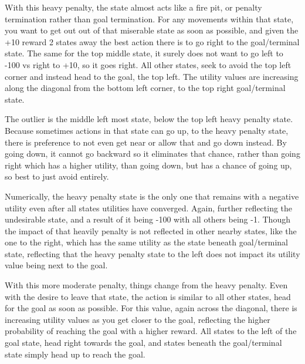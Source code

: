 \documentclass[12pt]{article}
\begin{document}
\begin{description}[leftmargin=0cm]
	\item[When R = -100] \hfill \break
		With this heavy penalty, the state almost acts like a fire pit, or penalty termination
		rather than goal termination. For any movements within that state, you want to get out
		out of that miserable state as soon as possible, and given the +10 reward 2 states away
		the best action there is to go right to the goal/terminal state. The same for the top
		middle state, it surely does not want to go left to -100 vs right to +10, so it goes
		right. All other states, seek to avoid the top left corner and instead head
		to the goal, the top left. The utility values are increasing along the diagonal from
		the bottom left corner, to the top right goal/terminal state.
		
		The outlier is the middle left most state, below the top left heavy penalty state.
		Because sometimes actions in that state can go up, to the heavy penalty state,
		there is preference to not even get near or allow that and go down instead. By going
		down, it cannot go backward so it eliminates that chance, rather than going right
		which has a higher utility, than going down, but has a chance of going up, so best
		to just avoid entirely.
		
		Numerically, the heavy penalty state is the only one that remains with a negative
		utility even after all states utilities have converged. Again, further reflecting
		the undesirable state, and a result of it being -100 with all others being -1.
		Though the impact of that heavily penalty is not reflected in other nearby states,
		like the one to the right, which has the same utility as the state beneath
		goal/terminal state, reflecting that the heavy penalty state to the left does not
		impact its utility value being next to the goal.

	\item[When R = -3] \hfill \break
		With this more moderate penalty, things change from the heavy penalty. Even with the
		desire to leave that state, the action is similar to all other states, head for the
		goal as soon as possible. For this value, again across the diagonal, there is increasing
		utility values as you get closer to the goal, reflecting the higher probability
		of reaching the goal with a higher reward. All states to the left of the goal state,
		head right towards the goal, and states beneath the goal/terminal state simply head
		up to reach the goal.
		

\end{description}
\end{document}
